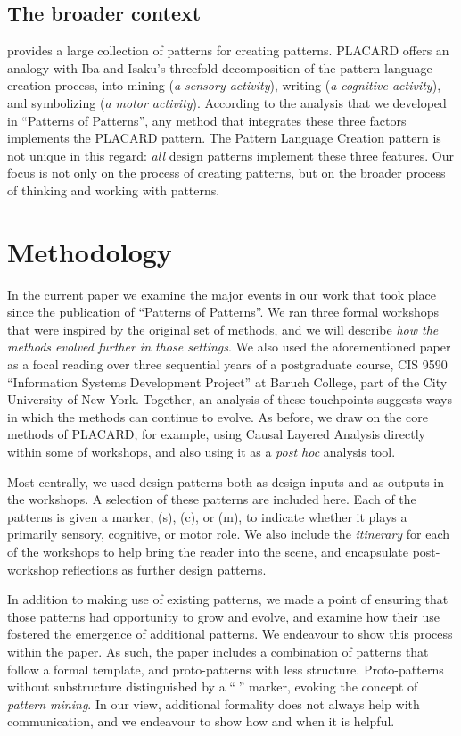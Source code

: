 \documentclass[acmlarge,timestamp]{acmart}
\DeclareRobustCommand{\scitshape}{\fontshape{\scitdefault}\selectfont}
\begin{document}
\subsection{The broader context}
\cite{iba2016pattern} provides a large collection of patterns for
creating patterns.  PLACARD offers an analogy with Iba and Isaku's
threefold decomposition of the pattern language creation process, into
mining (\emph{a sensory activity}), writing (\emph{a cognitive
activity}), and symbolizing (\emph{a motor activity}).  According to
the analysis that we developed in “Patterns of Patterns”, any method
that integrates these three factors implements the PLACARD pattern.
The {\scitshape Pattern Language Creation} pattern is not unique in
this regard: \emph{all} design patterns implement these three
features.  Our focus is not only on the process of creating patterns,
but on the broader process of thinking and working with patterns.

\section{Methodology}
\label{sec:org134acbb}
\label{methods}

In the current paper we examine the major events in our work that took
place since the publication of “Patterns of Patterns”.  We ran three
formal workshops that were inspired by the original set of methods,
and we will describe \emph{how the methods evolved further in those
settings}.  We also used the aforementioned paper as a focal reading
over three sequential years of a postgraduate course, CIS 9590
“Information Systems Development Project” at Baruch College, part of
the City University of New York.  Together, an analysis of these
touchpoints suggests ways in which the methods can continue to evolve.
As before, we draw on the core methods of PLACARD, for example, using
Causal Layered Analysis directly within some of workshops, and also
using it as a \emph{post hoc} analysis tool.

Most centrally, we used design patterns both as design inputs and as
outputs in the workshops.  A selection of these patterns are included
here.  Each of the patterns is given a marker, (s), (c), or (m), to
indicate whether it plays a primarily sensory, cognitive, or motor
role.  We also include the \emph{itinerary} for each of the workshops
to help bring the reader into the scene, and encapsulate post-workshop
reflections as further design patterns.

In addition to making use of existing patterns, we made a point of
ensuring that those patterns had opportunity to grow and evolve, and
examine how their use fostered the emergence of additional patterns.
We endeavour to show this process within the paper.  As such, the
paper includes a combination of patterns that follow a formal
template, and proto-patterns with less structure. 
Proto-patterns without substructure distinguished by a “💎” marker,
evoking the concept of \emph{pattern mining}.  In our view, additional
formality does not always help with communication, and we endeavour to
show how and when it is helpful.
\end{document}
